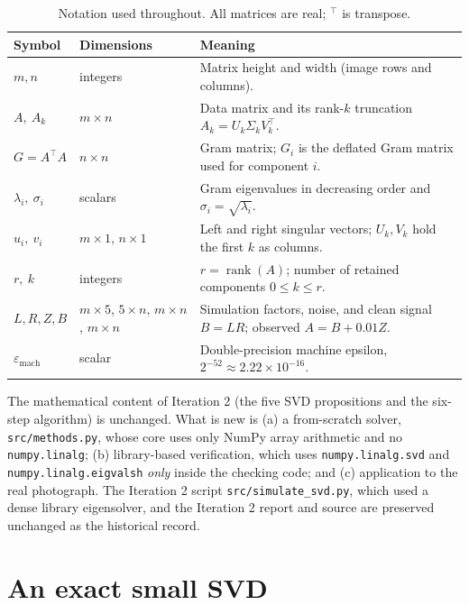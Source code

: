\documentclass[11pt,letterpaper]{article}
\numberwithin{equation}{section}
\newcommand{\rank}{\operatorname{rank}}
\newcommand{\eps}{\varepsilon_{\mathrm{mach}}}
\newcommand{\fn}[1]{\texttt{#1}}
\begin{document}
\begin{table}[H]
\centering\small
\caption{Notation used throughout. All matrices are real; $^\top$ is transpose.}
\label{tab:notation}
\begin{tabularx}{\linewidth}{@{}l l L@{}}\toprule
Symbol & Dimensions & Meaning\\\midrule
$m,n$ & integers & Matrix height and width (image rows and columns).\\
$A,\ A_k$ & $m\times n$ & Data matrix and its rank-$k$ truncation $A_k=U_k\Sigma_kV_k^\top$.\\
$G=A^\top A$ & $n\times n$ & Gram matrix; $G_i$ is the deflated Gram matrix used for component $i$.\\
$\lambda_i,\ \sigma_i$ & scalars & Gram eigenvalues in decreasing order and $\sigma_i=\sqrt{\lambda_i}$.\\
$u_i,\ v_i$ & $m\times1$, $n\times1$ & Left and right singular vectors; $U_k,V_k$ hold the first $k$ as columns.\\
$r,\ k$ & integers & $r=\rank(A)$; number of retained components $0\le k\le r$.\\
$L,R,Z,B$ & $m\times5$, $5\times n$, $m\times n$, $m\times n$ & Simulation factors, noise, and clean signal $B=LR$; observed $A=B+0.01Z$.\\
$\eps$ & scalar & Double-precision machine epsilon, $2^{-52}\approx2.22\times10^{-16}$.\\
\bottomrule\end{tabularx}
\end{table}

The mathematical content of Iteration 2 (the five SVD propositions and the six-step algorithm) is unchanged. What is new is (a) a from-scratch solver, \fn{src/methods.py}, whose core uses only NumPy array arithmetic and no \fn{numpy.linalg}; (b) library-based verification, which uses \fn{numpy.linalg.svd} and \fn{numpy.linalg.eigvalsh} \emph{only} inside the checking code; and (c) application to the real photograph. The Iteration 2 script \fn{src/simulate\_svd.py}, which used a dense library eigensolver, and the Iteration 2 report and source are preserved unchanged as the historical record.

\section{An exact small SVD}\label{sec:small}
\end{document}

